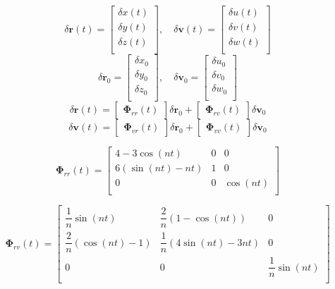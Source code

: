 $$
\delta \boldsymbol r(t) = \begin{bmatrix}
    \delta x(t)\\
    \delta y(t)\\
    \delta z(t)\\
\end{bmatrix}, \quad \delta \boldsymbol v(t) = \begin{bmatrix}
    \delta u(t)\\
    \delta v(t)\\
    \delta w(t)\\
\end{bmatrix}
$$
$$
\delta \boldsymbol r_0 = \begin{bmatrix}
    \delta x_0\\
    \delta y_0\\
    \delta z_0\\
\end{bmatrix}, \quad \delta \boldsymbol v_0 = \begin{bmatrix}
    \delta u_0\\
    \delta v_0\\
    \delta w_0\\
\end{bmatrix}
$$
$$
\delta \boldsymbol r(t) = \begin{bmatrix}
    \boldsymbol \Phi_{rr}(t)
\end{bmatrix} \delta \boldsymbol r_0 + \begin{bmatrix}
    \boldsymbol \Phi_{rv}(t)
\end{bmatrix} \delta \boldsymbol v_0
$$
$$
\delta \boldsymbol v(t) = \begin{bmatrix}
    \boldsymbol \Phi_{vr}(t)
\end{bmatrix} \delta \boldsymbol r_0 + \begin{bmatrix}
    \boldsymbol \Phi_{vv}(t)
\end{bmatrix} \delta \boldsymbol v_0
$$

$$
\boldsymbol \Phi_{rr}(t) = \begin{bmatrix}
    4 -3\cos(nt) & 0 & 0\\
    6(\sin(nt)-nt) & 1 & 0\\
    0 & 0 & \cos(nt)\\
\end{bmatrix}
$$

$$
\boldsymbol \Phi_{rv}(t) = \begin{bmatrix}
    \dfrac{1}{n}\sin(nt) & \dfrac{2}{n}(1-\cos(nt)) & 0\\
    \dfrac{2}{n}(\cos(nt)-1) & \dfrac{1}{n}(4\sin(nt)-3nt) & 0\\
    0 & 0 & \dfrac{1}{n}\sin(nt)\\
\end{bmatrix}
$$

